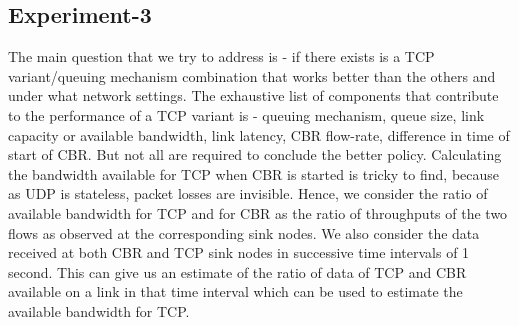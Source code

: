 \documentclass[USenglish,oneside,twocolumn]{article}
\begin{document}
\subsection{Experiment-3}
The main question that we try to address is - if there exists is a TCP variant/queuing mechanism combination that works better than the others and under what network settings. The exhaustive list of components that contribute to the performance of a TCP variant is - queuing mechanism, queue size, link capacity or available bandwidth, link latency, CBR flow-rate, difference in time of start of CBR. But not all are required to conclude the better policy. Calculating the bandwidth available for TCP when CBR is started is tricky to find, because as UDP is stateless, packet losses are invisible. Hence, we consider the ratio of available bandwidth for TCP and for CBR as the ratio of throughputs of the two flows as observed at the corresponding sink nodes. We also consider the data received at both CBR and TCP sink nodes in successive time intervals of 1 second. This can give us an estimate of the ratio of data of TCP and CBR available on a link in that time interval which can be used to estimate the available bandwidth for TCP.\\
\end{document}
